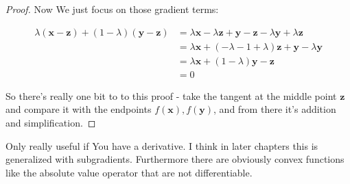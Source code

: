 \documentclass{article}
\begin{document}
\begin{proof}
			Now We just focus on those gradient terms:
			
			\begin{align*}
				 \lambda (\mathbf{x-z}) + (1-\lambda)(\mathbf{y-z}) &= \lambda\mathbf{x} - \lambda\mathbf{z} + \mathbf{y-z} - \lambda\mathbf{y}+\lambda\mathbf{z}\\
				&= \lambda\mathbf{x} + (-\lambda - 1 + \lambda)\mathbf{z} + \mathbf{y} - \lambda\mathbf{y}\\
				&= \lambda\mathbf{x} + (1-\lambda)\mathbf{y} -\mathbf{z} \\
				&= 0
			\end{align*}
			
			So there's really one bit to to this proof - take the tangent at the middle point $\mathbf{z}$ and compare it with the endpoints $f(\mathbf{x}), f(\mathbf{y})$, and from there it's addition and simplification.
		\end{proof}
		
		Only really useful if You have a derivative. I think in later chapters this is generalized with subgradients. Furthermore there are obviously convex functions like the absolute value operator that are not differentiable.
		
		
		
		
		
		
		
		
		
		
		
		
\end{document}
